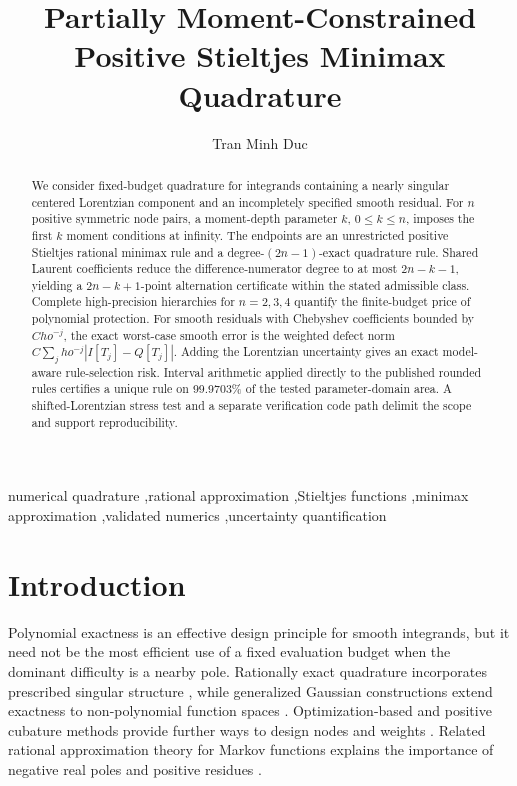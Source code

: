 \documentclass[preprint,12pt]{elsarticle}
\theoremstyle{remark}
\begin{document}
\begin{frontmatter}

\title{Partially Moment-Constrained Positive Stieltjes Minimax Quadrature}

\author[inst1]{Tran Minh Duc}
\n{}


\begin{abstract}
We consider fixed-budget quadrature for integrands containing a
nearly singular centered Lorentzian component and an incompletely
specified smooth residual. For \(n\) positive symmetric node pairs, a
moment-depth parameter \(k\), \(0\leq k\leq n\), imposes the first
\(k\) moment conditions at infinity. The endpoints are an unrestricted
positive Stieltjes rational minimax rule and a degree-\((2n-1)\)-exact
quadrature rule. Shared Laurent coefficients reduce the
difference-numerator degree to at most \(2n-k-1\), yielding a
\(2n-k+1\)-point alternation certificate within the stated admissible
class. Complete high-precision hierarchies for \(n=2,3,4\) quantify the
finite-budget price of polynomial protection. For smooth residuals with
Chebyshev coefficients bounded by \(C
ho^{-j}\), the exact worst-case
smooth error is the weighted defect norm
\(C\sum_j
ho^{-j}|I[T_j]-Q[T_j]|\). Adding the Lorentzian uncertainty
gives an exact model-aware rule-selection risk. Interval arithmetic
applied directly to the published rounded rules certifies a unique rule
on 99.9703\% of the tested parameter-domain area. A
shifted-Lorentzian stress test and a separate verification code path
delimit the scope and support reproducibility.
\end{abstract}

\begin{keyword}
numerical quadrature \sep rational approximation \sep Stieltjes functions
\sep minimax approximation \sep validated numerics
\sep uncertainty quantification
\end{keyword}

\end{frontmatter}

\section{Introduction}

Polynomial exactness is an effective design principle for smooth
integrands, but it need not be the most efficient use of a fixed
evaluation budget when the dominant difficulty is a nearby pole.
Rationally exact quadrature incorporates prescribed singular structure
\cite{gautschi1993}, while generalized Gaussian constructions extend
exactness to non-polynomial function spaces \cite{huybrechs2017}.
Optimization-based and positive cubature methods provide further ways
to design nodes and weights \cite{keshavarzzadeh2018,glaubitz2020}.
Related rational approximation theory for Markov functions explains the
importance of negative real poles and positive residues
\cite{beckermann2021}.
\end{document}
